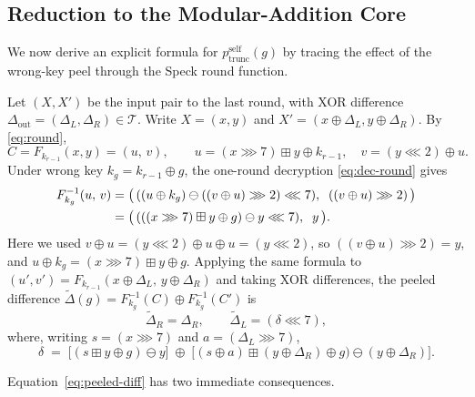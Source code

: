 \documentclass[runningheads]{llncs}
\newcommand{\pself}{p^{\mathrm{self}}_{\mathrm{trunc}}}
\newcommand{\xor}{\oplus}
\newcommand{\ror}[2]{(#1 \ggg #2)}
\newcommand{\rol}[2]{(#1 \lll #2)}
\begin{document}
\subsection{Reduction to the Modular-Addition Core}
\label{subsec:reduction}

We now derive an explicit formula for $\pself(g)$ by tracing the
effect of the wrong-key peel through the Speck round function.

Let $(X, X')$ be the input pair to the last round, with XOR difference
$\Delta_{\mathrm{out}} = (\Delta_L, \Delta_R) \in \mathcal{T}$.  Write
$X = (x, y)$ and $X' = (x \xor \Delta_L, y \xor \Delta_R)$.
By \eqref{eq:round},
\[
  C = F_{k_{r-1}}(x,y) = (u,\, v),
  \qquad
  u = \ror{x}{7} \boxplus y \xor k_{r-1},
  \quad
  v = \rol{y}{2} \xor u.
\]
Under wrong key $k_g = k_{r-1} \xor g$, the one-round decryption
\eqref{eq:dec-round} gives
\begin{align}
  F_{k_g}^{-1}(u,\,v)
  &= \bigl(\, \rol{(u \xor k_g) \ominus \ror{(v \xor u)}{2}}{7},\;\;
             \ror{(v \xor u)}{2} \,\bigr) \notag \\
  \label{eq:wrong-peel}
  &= \bigl(\, \rol{(\ror{x}{7} \boxplus y \xor g) \ominus y}{7},\;\; y \,\bigr).
\end{align}
Here we used $v \xor u = \rol{y}{2} \xor u \xor u = \rol{y}{2}$, so
$\ror{(v \xor u)}{2} = y$, and $u \xor k_g = \ror{x}{7} \boxplus y \xor g$.
Applying the same formula to $(u', v') = F_{k_{r-1}}(x \xor \Delta_L,\,
y \xor \Delta_R)$ and taking XOR differences, the peeled
difference $\widetilde\Delta(g) = F_{k_g}^{-1}(C) \xor F_{k_g}^{-1}(C')$
is
\begin{equation}
  \label{eq:peeled-diff}
  \widetilde\Delta_R = \Delta_R, \qquad
  \widetilde\Delta_L = \rol{\delta}{7},
\end{equation}
where, writing $s = \ror{x}{7}$ and $a = \ror{\Delta_L}{7}$,
\begin{equation}
  \label{eq:delta-core}
  \delta \;=\;
  \bigl[(s \boxplus y \xor g) \ominus y\bigr]
  \;\xor\;
  \bigl[(s \xor a) \boxplus (y \xor \Delta_R) \xor g) \ominus (y \xor \Delta_R)\bigr].
\end{equation}

Equation~\eqref{eq:peeled-diff} has two immediate consequences.
\end{document}
